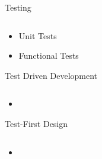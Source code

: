 \documentclass{beamer}
\author[Chris Simpkins] 
{Christopher Simpkins \\\texttt{chris.simpkins@gatech.edu}}
\institute[Georgia Tech] %
\date[CS 1331]{}
\begin{document}
\begin{frame}
  \titlepage
\end{frame}



\begin{frame}[fragile]{Testing}


\begin{lstlisting}[language=Java]

\end{lstlisting}

\begin{itemize}
\item Unit Tests
\item Functional Tests
\end{itemize}


\end{frame}

\begin{frame}[fragile]{Test Driven Development}


\begin{lstlisting}[language=Java]

\end{lstlisting}

\begin{itemize}
\item
\end{itemize}


\end{frame}

\begin{frame}[fragile]{Test-First Design}


\begin{lstlisting}[language=Java]

\end{lstlisting}

\begin{itemize}
\item
\end{itemize}


\end{frame}
\end{document}
